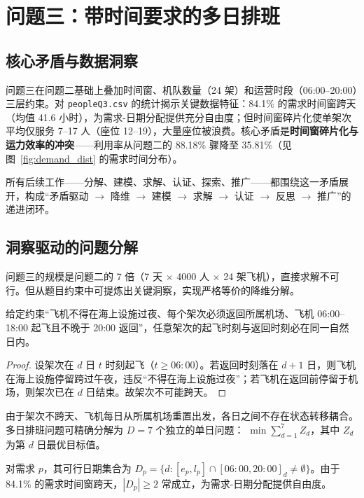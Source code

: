 \section{问题三：带时间要求的多日排班}

\subsection{核心矛盾与数据洞察}

问题三在问题二基础上叠加时间窗、机队数量（24 架）和运营时段（06:00--20:00）三层约束。对 \texttt{peopleQ3.csv} 的统计揭示关键数据特征：84.1\% 的需求时间窗跨天（均值 41.6 小时），为需求-日期分配提供充分自由度；但时间窗碎片化使单架次平均仅服务 7--17 人（座位 12--19），大量座位被浪费。核心矛盾是\textbf{时间窗碎片化与运力效率的冲突}——利用率从问题二的 88.18\% 骤降至 35.81\%（见图~\ref{fig:demand_dist} 的需求时间分布）。

所有后续工作——分解、建模、求解、认证、探索、推广——都围绕这一矛盾展开，构成``矛盾驱动 $\to$ 降维 $\to$ 建模 $\to$ 求解 $\to$ 认证 $\to$ 反思 $\to$ 推广''的递进闭环。

\subsection{洞察驱动的问题分解}

问题三的规模是问题二的 7 倍（7 天 $\times$ 4000 人 $\times$ 24 架飞机），直接求解不可行。但从题目约束中可提炼出关键洞察，实现严格等价的降维分解。

\begin{theorem}
\label{thm:decouple}
给定约束``飞机不得在海上设施过夜、每个架次必须返回所属机场、飞机 06:00--18:00 起飞且不晚于 20:00 返回''，任意架次的起飞时刻与返回时刻必在同一自然日内。
\end{theorem}

\begin{proof}
设架次在 $d$ 日 $t$ 时刻起飞（$t \geq 06{:}00$）。若返回时刻落在 $d+1$ 日，则飞机在海上设施停留跨过午夜，违反``不得在海上设施过夜''；若飞机在返回前停留于机场，则架次已在 $d$ 日结束。故架次不可能跨天。
\end{proof}

\begin{corollary}
\label{cor:indep}
由于架次不跨天、飞机每日从所属机场重置出发，各日之间不存在状态转移耦合。多日排班问题可精确分解为 $D = 7$ 个独立的单日问题：
$\min \sum_{d=1}^{7} Z_d$，其中 $Z_d$ 为第 $d$ 日最优目标值。
\end{corollary}

\begin{corollary}
\label{cor:dateset}
对需求 $p$，其可行日期集合为 $D_p = \{ d : [e_p, l_p] \cap [06{:}00, 20{:}00]_d \neq \emptyset \}$。由于 84.1\% 的需求时间窗跨天，$|D_p| \geq 2$ 常成立，为需求-日期分配提供自由度。
\end{corollary}

